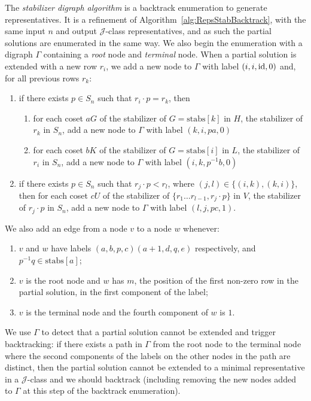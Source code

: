 \documentclass[11pt]{article}
\numberwithin{equation}{section}
\newcommand{\id}{\mbox{\rm id}}
\newcommand{\J}{\mathscr{J}}
\begin{document}
The \emph{stabilizer digraph algorithm} is a backtrack enumeration to generate
representatives. It is a refinement of Algorithm~\ref{alg:RepsStabBacktrack},
with the same input $n$ and output $\J$-class representatives, and as such the
partial solutions are enumerated in the same way. We also begin the enumeration
with a digraph $\Gamma$ containing a \emph{root} node and \emph{terminal} node.
 When a partial solution is extended with a new row
$r_i$, we add a new node to
$\Gamma$ with label $(i, i, \id, 0)$ and, for all previous rows $r_k$:
\begin{enumerate}
  \item if there exists $p \in S_n$ such that $r_i \cdot p = r_k$, then
    \begin{enumerate}
      \item for each coset $aG$ of the stabilizer of $G = \text{stabs}[k]$ in
        $H$, the stabilizer of $r_k$ in $S_n$, add a new node to $\Gamma$ with
        label $(k, i, pa, 0)$
      \item for each coset $bK$ of the stabilizer of $G = \text{stabs}[i]$ in
        $L$, the stabilizer of $r_i$ in $S_n$, add a new node to $\Gamma$ with
        label $(i, k, p^{-1} b, 0)$
    \end{enumerate}
  \item if there exists $p \in S_n$ such that $r_j \cdot p < r_l$, where $(j, l)
    \in \{(i, k), (k, i)\}$, then for each coset $cU$ of the stabilizer of $\{r_1
      \ldots r_{l - 1}, r_j \cdot p \}$ in $V$, the stabilizer of $r_j \cdot p$
    in $S_n$, add a new node to $\Gamma$ with label $(l, j, pc, 1)$.
\end{enumerate}
We also add an edge from a node $v$ to a node $w$ whenever:
\begin{enumerate}
  \item $v$ and $w$ have labels $(a, b, p, c) (a + 1, d, q, e)$ respectively,
    and $p^{-1} q \in \text{stabs}[a]$;
  \item $v$ is the root node and $w$ has $m$, the position of the first non-zero
    row in the partial solution, in the first component of the label;
  \item $v$ is the terminal node and the fourth component of $w$ is $1$.
\end{enumerate}

We use $\Gamma$ to detect that a partial solution cannot be extended and trigger
backtracking: if there exists a path in $\Gamma$ from the root node to the
terminal node where the second components of the labels on the other nodes in
the path are distinct, then the partial solution cannot be extended to a minimal
representative in a $\J$-class and we should backtrack (including removing the
new nodes added to $\Gamma$ at this step of the backtrack enumeration).
\end{document}

